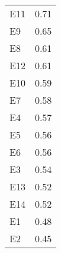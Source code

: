 \begin{table}

\caption{}
\centering
\begin{tabular}[t]{lr}
\toprule
E11 & 0.71\\
E9 & 0.65\\
E8 & 0.61\\
E12 & 0.61\\
E10 & 0.59\\
\addlinespace
E7 & 0.58\\
E4 & 0.57\\
E5 & 0.56\\
E6 & 0.56\\
E3 & 0.54\\
\addlinespace
E13 & 0.52\\
E14 & 0.52\\
E1 & 0.48\\
E2 & 0.45\\
\bottomrule
\end{tabular}
\end{table}
